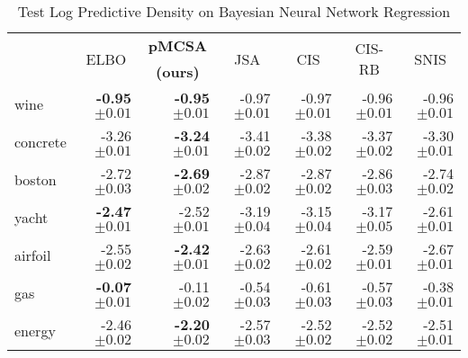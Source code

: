 
\begin{table*}
  \centering
  \caption{Test Log Predictive Density on Bayesian Neural Network Regression}\label{table:gp}
  \vspace{-0.05in}
  \setlength{\tabcolsep}{4pt}
  \begin{threeparttable}
  \begin{tabular}{lrrrrrr}
    \toprule
    & \multicolumn{1}{c}{\multirow{2}{*}{ELBO}} & \multicolumn{1}{c}{\multirow{1}{*}{\textbf{pMCSA}}} & \multicolumn{1}{c}{\multirow{2}{*}{JSA}} & \multicolumn{1}{c}{\multirow{2}{*}{CIS}} & \multicolumn{1}{c}{\multirow{2}{*}{CIS-RB}} & \multicolumn{1}{c}{\multirow{2}{*}{SNIS}} \\
    & & \multicolumn{1}{c}{\textbf{(ours)}} & & & & \\
    \midrule
    wine & {\bf-0.95 {\scriptsize{\(\pm 0.01\)}}} & {\bf-0.95 {\scriptsize{\(\pm 0.01\)}}} & {-0.97 {\scriptsize{\(\pm 0.01\)}}} & {-0.97 {\scriptsize{\(\pm 0.01\)}}} & {-0.96 {\scriptsize{\(\pm 0.01\)}}} & {-0.96 {\scriptsize{\(\pm 0.01\)}}} \\
    concrete & {-3.26 {\scriptsize{\(\pm 0.01\)}}} & {\bf-3.24 {\scriptsize{\(\pm 0.01\)}}} & {-3.41 {\scriptsize{\(\pm 0.02\)}}} & {-3.38 {\scriptsize{\(\pm 0.02\)}}} & {-3.37 {\scriptsize{\(\pm 0.02\)}}} & {-3.30 {\scriptsize{\(\pm 0.01\)}}} \\
    boston & {-2.72 {\scriptsize{\(\pm 0.03\)}}} & {\bf-2.69 {\scriptsize{\(\pm 0.02\)}}} & {-2.87 {\scriptsize{\(\pm 0.02\)}}} & {-2.87 {\scriptsize{\(\pm 0.02\)}}} & {-2.86 {\scriptsize{\(\pm 0.03\)}}} & {-2.74 {\scriptsize{\(\pm 0.02\)}}} \\
    yacht & {\bf-2.47 {\scriptsize{\(\pm 0.01\)}}} & {-2.52 {\scriptsize{\(\pm 0.01\)}}} & {-3.19 {\scriptsize{\(\pm 0.04\)}}} & {-3.15 {\scriptsize{\(\pm 0.04\)}}} & {-3.17 {\scriptsize{\(\pm 0.05\)}}} & {-2.61 {\scriptsize{\(\pm 0.01\)}}} \\
    airfoil & {-2.55 {\scriptsize{\(\pm 0.02\)}}} & {\bf-2.42 {\scriptsize{\(\pm 0.01\)}}} & {-2.63 {\scriptsize{\(\pm 0.02\)}}} & {-2.61 {\scriptsize{\(\pm 0.02\)}}} & {-2.59 {\scriptsize{\(\pm 0.01\)}}} & {-2.67 {\scriptsize{\(\pm 0.01\)}}} \\
    gas & {\bf-0.07 {\scriptsize{\(\pm 0.01\)}}} & {-0.11 {\scriptsize{\(\pm 0.02\)}}} & {-0.54 {\scriptsize{\(\pm 0.03\)}}} & {-0.61 {\scriptsize{\(\pm 0.03\)}}} & {-0.57 {\scriptsize{\(\pm 0.03\)}}} & {-0.38 {\scriptsize{\(\pm 0.01\)}}} \\
    energy & {-2.46 {\scriptsize{\(\pm 0.02\)}}} & {\bf-2.20 {\scriptsize{\(\pm 0.02\)}}} & {-2.57 {\scriptsize{\(\pm 0.03\)}}} & {-2.52 {\scriptsize{\(\pm 0.02\)}}} & {-2.52 {\scriptsize{\(\pm 0.02\)}}} & {-2.51 {\scriptsize{\(\pm 0.01\)}}} \\

\end{tabular}
\end{threeparttable}
\end{table*}
